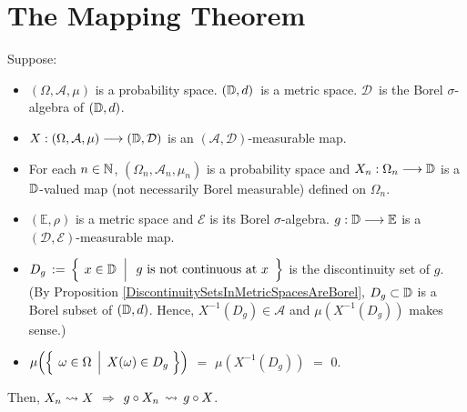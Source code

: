 

\section{The Mapping Theorem}
\setcounter{theorem}{0}
\setcounter{equation}{0}


\renewcommand{\theenumi}{\roman{enumi}}
\renewcommand{\labelenumi}{\textnormal{(\theenumi)}$\;\;$}


\begin{theorem}
\mbox{}\vskip 0.1cm
\noindent
Suppose:
\begin{itemize}
\item
	$(\Omega,\mathcal{A},\mu)$ is a probability space.
	$(\mathbb{D},d)$\, is a metric space.
	$\mathcal{D}$\, is the Borel $\sigma$-algebra of $(\mathbb{D},d)$.
\item
	$X : (\Omega,\mathcal{A},\mu) \longrightarrow (\mathbb{D},\mathcal{D})$
	is an $(\mathcal{A},\mathcal{D})$-measurable map.
\item
	For each $n \in \mathbb{N}$,
	$(\Omega_{n},\mathcal{A}_{n},\mu_{n})$ is a probability space and
	$X_{n} : \Omega_{n} \longrightarrow \mathbb{D}$
	is a $\mathbb{D}$-valued map (not necessarily Borel measurable) defined on $\Omega_{n}$.
\item
	$(\mathbb{E},\rho)$ is a metric space and $\mathcal{E}$ is its Borel $\sigma$-algebra.
	$g : \mathbb{D} \longrightarrow \mathbb{E}$ is a $(\mathcal{D},\mathcal{E})$-measurable map.
\item
	$D_{g} \, := \,
	\left\{\;\left.
		x\overset{{\color{white}.}}{\in}\D
		\;\;\right\vert
		\begin{array}{c}\textnormal{$g$ is not continuous at $x$}\end{array}
		\right\}$
	is the discontinuity set of $g$.
	\vskip 0.1cm
	(By Proposition \ref{DiscontinuitySetsInMetricSpacesAreBorel}, $D_{g} \subset \mathbb{D}$ is a Borel subset of $(\mathbb{D},d)$.
	Hence, $X^{-1}(D_{g}) \in \mathcal{A}$ and $\mu\!\left(X^{-1}(D_{g})\right)$ makes sense.)
\item
	$\mu\!\left(\left\{\;\left.\omega\overset{{\color{white}.}}{\in}\Omega\;\,\right\vert\;X(\omega)\in D_{g}\;\right\}\right)$
	\;$=$\; $\mu\!\left(X^{-1}(D_{g})\right)$
	\;$=$\; $0$.
\end{itemize}
Then, \;$X_{n} \rightsquigarrow X$ \;$\Longrightarrow$\; $g \circ X_{n} \,\rightsquigarrow\, g \circ X$.
\end{theorem}
\proof

